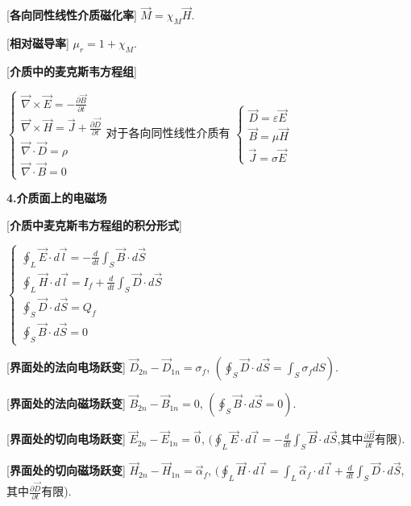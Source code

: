 [\textbf{各向同性线性介质磁化率}] $\vec M=\chi_M\vec H$.\par

[\textbf{相对磁导率}] $\mu_r=1+\chi_M$.\par

[\textbf{介质中的麦克斯韦方程组}] \par
\qquad $\begin{cases} \vec\nabla\times\vec E=-\frac{\partial\vec B}{\partial t}\\ \vec\nabla\times\vec H=\vec J+\frac{\partial\vec D}{\partial t}\\ \vec\nabla\cdot\vec D=\rho\\ \vec\nabla\cdot\vec B=0 \end{cases}$\qquad 对于各向同性线性介质有 $\begin{cases}\vec D=\varepsilon \vec E\\ \vec B=\mu\vec H\\\vec J=\sigma\vec E\end{cases}$\par

\begin{center}
 \textbf{4.介质面上的电磁场}
\end{center}

[\textbf{介质中麦克斯韦方程组的积分形式}]\par
\qquad $\begin{cases}\oint_L\vec E\cdot d\vec l=-\frac{d}{dt}\int_S\vec B\cdot d\vec S\\\oint_L\vec H\cdot d\vec l=I_f+\frac{d}{dt}\int_S\vec D\cdot d\vec S\\\oint_S\vec D\cdot d\vec S=Q_f\\\oint_S\vec B\cdot d\vec S=0\end{cases}$\par

[\textbf{界面处的法向电场跃变}] $\vec D_{2n}-\vec D_{1n}=\sigma_f$, $(\oint_S\vec D\cdot d\vec S=\int_S\sigma_fdS)$.\par

[\textbf{界面处的法向磁场跃变}] $\vec B_{2n}-\vec B_{1n}=0$, $(\oint_S\vec B\cdot d\vec S=0)$.\par

[\textbf{界面处的切向电场跃变}] $\vec E_{2n}-\vec E_{1n}=\vec 0$, $(\oint_L\vec E\cdot d\vec l=-\frac{d}{dt}\int_S\vec B\cdot d\vec S$,其中$\frac{\partial \vec B}{\partial t}$有限).\par

[\textbf{界面处的切向磁场跃变}] $\vec H_{2n}-\vec H_{1n}=\vec\alpha_f$, $(\oint_L\vec H\cdot d\vec l=\int_L\vec\alpha_f\cdot d\vec l+\frac{d}{dt}\int_S\vec D\cdot d\vec S$, 其中$\frac{\partial \vec D}{\partial t}$有限).\par

